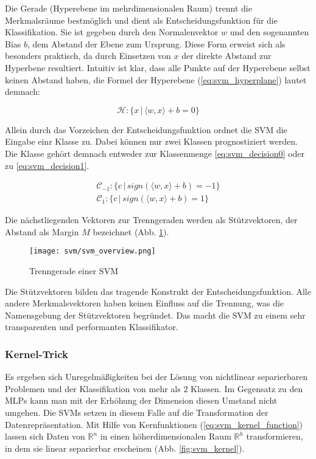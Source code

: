 Die Gerade (Hyperebene im mehrdimensionalen Raum) trennt die Merkmalsräume bestmöglich und dient als Entscheidungsfunktion für die Klassifikation. Sie ist gegeben durch den Normalenvektor $w$ und den sogenannten Bias $b$, dem Abstand der Ebene zum Ursprung. Diese Form erweist sich als besonders praktisch, da durch Einsetzen von $x$ der direkte Abstand zur Hyperbene resultiert.
Intuitiv ist klar, dass alle Punkte auf der Hyperebene selbst keinen Abstand haben, die Formel der Hyperebene (\ref{eq:svm_hyperplane}) lautet demnach: 
 
\begin{equation}
\label{eq:svm_hyperplane}
    \mathcal{H}: \{ x \,|\, \langle w,x \rangle + b = 0 \}
\end{equation}
 
Allein durch das Vorzeichen der Entscheidungsfunktion ordnet die \ac{SVM} die Eingabe einr Klasse zu. Dabei können nur zwei Klassen  prognostiziert werden. Die Klasse gehört demnach entweder zur Klassenmenge \ref{eq:svm_decision0} oder zu \ref{eq:svm_decision1}.

\begin{eqnarray}
    \mathcal{C}_{-1}: \{ c \,|\, sign(\langle w,x \rangle + b) = -1 \} \label{eq:svm_decision0} \\
    \mathcal{C}_1: \{ c \,|\, sign(\langle w,x \rangle + b) = 1 \} \label{eq:svm_decision1}
\end{eqnarray}

Die nächstliegenden Vektoren zur Trenngeraden werden als Stützvektoren, der Abstand als Margin $M$ bezeichnet (Abb. \ref{fig:svm_separator}). 

\begin{figure}[htbp] \centering
    \texttt{[image: svm/svm\_overview.png]}
    \caption{Trenngerade einer SVM}
    \label{fig:svm_separator}
\end{figure}

Die Stützvektoren bilden das tragende Konstrukt der Entscheidungsfunktion. 
Alle andere Merkmalsvektoren haben keinen Einfluss auf die Trennung, was die Namensgebung der Stützvektoren begründet. 
Das macht die \ac{SVM} zu einem sehr transparenten und performanten Klassifikator. 


\subsubsection{Kernel-Trick}
Es ergeben sich Unregelmäßigkeiten bei der Lösung von nichtlinear separierbaren Problemen und der Klassifikation von mehr als 2 Klassen.
Im Gegensatz zu den MLPs kann man mit der Erhöhung der Dimension diesen Umstand nicht umgehen. 
Die \ac{SVM}s setzen in diesem Falle auf die Transformation der Datenrepräsentation. 
Mit Hilfe von Kernfunktionen (\ref{eq:svm_kernel_function}) lassen sich Daten von $\mathbb{R}^n$ in einen höherdimensionalen Raum $\mathbb{R}^h$ transformieren, in dem sie linear separierbar erscheinen (Abb. \ref{fig:svm_kernel}). 

